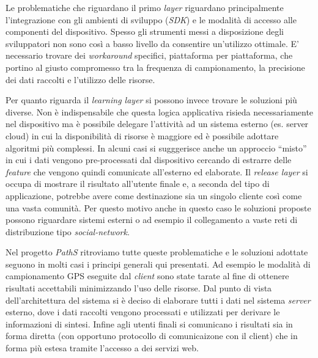 Le problematiche che riguardano il primo \emph{layer} riguardano principalmente l'integrazione con gli ambienti di sviluppo (\emph{SDK}) e le modalità di accesso alle componenti del dispositivo. Spesso gli strumenti messi a disposizione degli sviluppatori non sono così a basso livello da consentire un'utilizzo ottimale. E' necessario trovare dei \emph{workaround} specifici, piattaforma per piattaforma, che portino al giusto compromesso tra la frequenza di campionamento, la precisione dei dati raccolti e l'utilizzo delle risorse.

Per quanto riguarda il \emph{learning layer} si possono invece trovare le soluzioni più diverse. Non è indispensabile che questa logica applicativa risieda necessariamente nel dispositivo ma è possibile delegare l'attività ad un sistema esterno (es. server cloud) in cui la disponibilità di risorse è maggiore ed è possibile adottare algoritmi più complessi. In alcuni casi si sugggerisce anche un approccio ``misto'' in cui i dati vengono pre-processati dal dispositivo cercando di estrarre delle \emph{feature} che vengono quindi comunicate all'esterno ed elaborate.
Il \emph{release layer} si occupa di mostrare il risultato all'utente finale e, a seconda del tipo di applicazione, potrebbe avere come destinazione sia un singolo cliente così come una vasta comunità. Per questo motivo anche in questo caso le soluzioni proposte possono riguardare sistemi esterni o ad esempio il collegamento a vaste reti di distribuzione tipo \emph{social-network}.

Nel progetto \emph{PathS} ritroviamo tutte queste problematiche e le soluzioni adottate seguono in molti casi i principi generali qui presentati. Ad esempio le modalità di campionamento GPS eseguite dal \emph{client} sono state tarate al fine di ottenere risultati accettabili minimizzando l'uso delle risorse. Dal punto di vista dell'architettura del sistema si è deciso di elaborare tutti i dati nel sistema \emph{server} esterno, dove i dati raccolti vengono processati e utilizzati per derivare le informazioni di sintesi. Infine agli utenti finali si comunicano i risultati sia in forma diretta (con opportuno protocollo di comunicaizone con il client) che in forma più estesa tramite l'accesso a dei servizi web.


